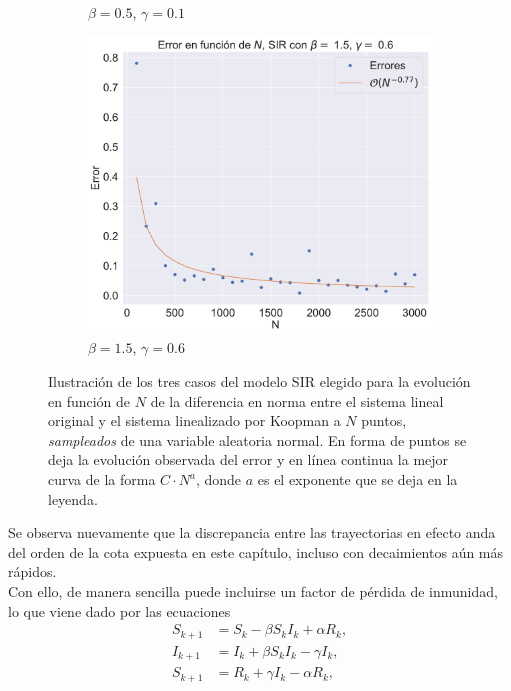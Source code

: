 \begin{figure}[h]
\begin{subfigure}[b]{0.32\textwidth}
        \caption{$\beta=0.5$, $\gamma=0.1$}
    \end{subfigure}
    \hfill
    \begin{subfigure}[b]{0.32\textwidth}
        \centering
        \includegraphics[width=\textwidth]{img/content/chapter3/SIR3Errors.pdf}
        \caption{$\beta=1.5$, $\gamma=0.6$}
    \end{subfigure}
    \caption{Ilustración de los tres casos del modelo SIR elegido para la evolución en función de $N$ de la diferencia en norma entre el sistema lineal original y el sistema linealizado por Koopman a $N$ puntos,  \textit{sampleados} de una variable aleatoria normal. En forma de puntos se deja la evolución observada del error y en línea continua la mejor curva de la forma $C \cdot N^{a}$, donde $a$ es el exponente que se deja en la leyenda.}
    \label{fig:ErrorSIR}
\end{figure}
Se observa nuevamente que la discrepancia entre las trayectorias en efecto anda del orden de la cota expuesta en este capítulo, incluso con decaimientos aún más rápidos.\\
Con ello, de manera sencilla puede incluirse un factor de pérdida de inmunidad, lo que viene dado por las ecuaciones
\begin{equation}
    \begin{aligned}
    S_{k+1} &= S_k -\beta S_k I_k + \alpha R_k, \\
    I_{k+1} &= I_k + \beta S_k I_k - \gamma I_k, \\
    S_{k+1} &= R_k + \gamma I_k - \alpha R_k,
    \end{aligned}
    \label{eq:SIR_rec}
\end{equation}
